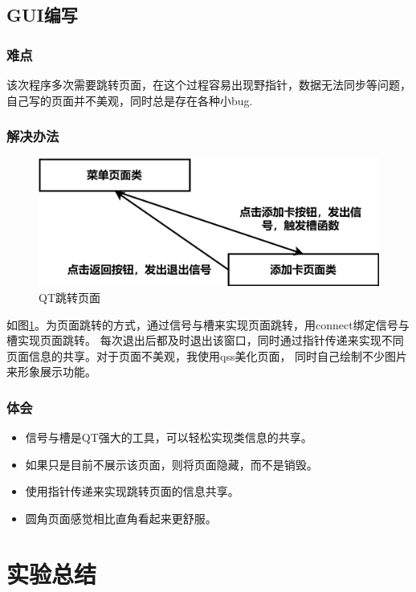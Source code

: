 \documentclass{article}
\begin{document}
    \subsection{GUI编写}
    \subsubsection{难点}
    该次程序多次需要跳转页面，在这个过程容易出现野指针，数据无法同步等问题，自己写的页面并不美观，同时总是存在各种小bug.
    \subsubsection{解决办法}
    \begin{figure}[h]
        \centering
        \includegraphics[scale=0.1]{figure/qt_change.png}
        \caption{QT跳转页面}
        \label{QTchange}
    \end{figure}
    如图\ref{QTchange}。为页面跳转的方式，通过信号与槽来实现页面跳转，用connect绑定信号与槽实现页面跳转。
    每次退出后都及时退出该窗口，同时通过指针传递来实现不同页面信息的共享。对于页面不美观，我使用qss美化页面，
    同时自己绘制不少图片来形象展示功能。
    \subsubsection{体会}
    \begin{itemize}
        \item 信号与槽是QT强大的工具，可以轻松实现类信息的共享。
        \item 如果只是目前不展示该页面，则将页面隐藏，而不是销毁。
        \item 使用指针传递来实现跳转页面的信息共享。
        \item 圆角页面感觉相比直角看起来更舒服。
    \end{itemize}
    \newpage
    \section{实验总结}
\end{document}
